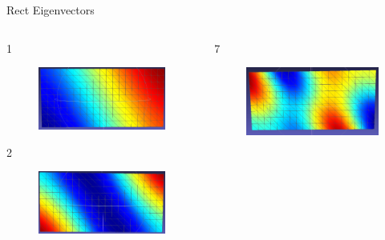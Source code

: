 \documentclass{beamer}
\begin{document}
\begin{frame}{Rect Eigenvectors}
\begin{columns}
\begin{column}[T]{5cm}
1
\begin{figure}[t]
    \includegraphics[width=\textwidth]{Harmonics/RectModes/rect1.png}
\end{figure}
2
\begin{figure}[t]
    \includegraphics[width=\textwidth]{Harmonics/RectModes/rect2.png}
\end{figure}
\end{column}
\begin{column}[T]{5cm}
7
\begin{figure}[t]
    \includegraphics[width=\textwidth]{Harmonics/RectModes/rect7.png}

\end{figure}
\end{column}
\end{columns}
\end{frame}
\end{document}
